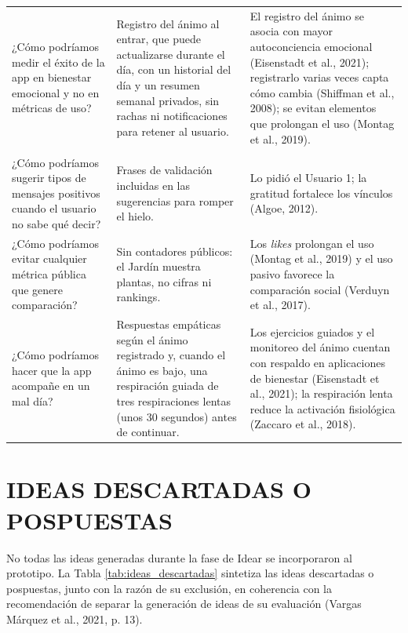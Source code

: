 \begin{longtable}{
  >{\raggedright\arraybackslash}p{}
  >{\raggedright\arraybackslash}p{}
  >{\raggedright\arraybackslash}p{}
}
¿Cómo podríamos medir el éxito de la app en bienestar emocional y no en métricas de uso?
&
Registro del ánimo al entrar, que puede actualizarse durante el día, con un historial del día y un resumen semanal privados, sin rachas ni notificaciones para retener al usuario.
&
El registro del ánimo se asocia con mayor autoconciencia emocional (Eisenstadt et al., 2021); registrarlo varias veces capta cómo cambia (Shiffman et al., 2008); se evitan elementos que prolongan el uso (Montag et al., 2019). \\[6pt]

\addlinespace[4pt]
\multicolumn{3}{l}{\textbf{Conocimiento: Mensajes positivos, sin \textit{likes} ni métricas públicas}} \\[4pt]
¿Cómo podríamos sugerir tipos de mensajes positivos cuando el usuario no sabe qué decir?
&
Frases de validación incluidas en las sugerencias para romper el hielo.
&
Lo pidió el Usuario 1; la gratitud fortalece los vínculos (Algoe, 2012). \\[6pt]

¿Cómo podríamos evitar cualquier métrica pública que genere comparación?
&
Sin contadores públicos: el Jardín muestra plantas, no cifras ni rankings.
&
Los \textit{likes} prolongan el uso (Montag et al., 2019) y el uso pasivo favorece la comparación social (Verduyn et al., 2017). \\[6pt]

¿Cómo podríamos hacer que la app acompañe en un mal día?
&
Respuestas empáticas según el ánimo registrado y, cuando el ánimo es bajo, una respiración guiada de tres respiraciones lentas (unos 30 segundos) antes de continuar.
&
Los ejercicios guiados y el monitoreo del ánimo cuentan con respaldo en aplicaciones de bienestar (Eisenstadt et al., 2021); la respiración lenta reduce la activación fisiológica (Zaccaro et al., 2018). \\

\end{longtable}

\section{IDEAS DESCARTADAS O POSPUESTAS}
No todas las ideas generadas durante la fase de Idear se incorporaron al prototipo. La Tabla \ref{tab:ideas_descartadas} sintetiza las ideas descartadas o pospuestas, junto con la razón de su exclusión, en coherencia con la recomendación de separar la generación de ideas de su evaluación (Vargas Márquez et al., 2021, p. 13).

